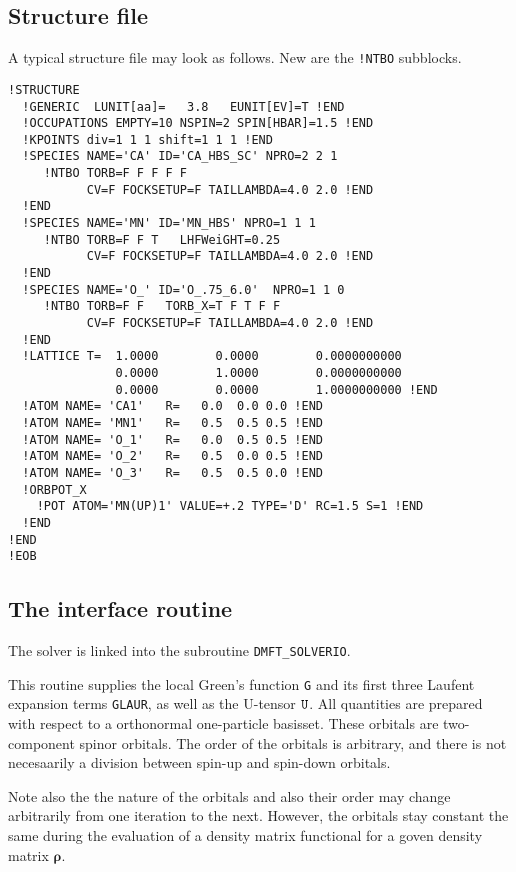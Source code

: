 \documentclass[11pt,a4paper]{report}
\newcommand{\mat}[1]{\bm{#1}}  %
\begin{document}
\subsection{Structure file}
A typical structure file may look as follows. New are the \verb|!NTBO|
subblocks.
\begin{verbatim}
!STRUCTURE 
  !GENERIC  LUNIT[aa]=   3.8   EUNIT[EV]=T !END
  !OCCUPATIONS EMPTY=10 NSPIN=2 SPIN[HBAR]=1.5 !END
  !KPOINTS div=1 1 1 shift=1 1 1 !END
  !SPECIES NAME='CA' ID='CA_HBS_SC' NPRO=2 2 1 
     !NTBO TORB=F F F F F  
           CV=F FOCKSETUP=F TAILLAMBDA=4.0 2.0 !END 
  !END
  !SPECIES NAME='MN' ID='MN_HBS' NPRO=1 1 1 
     !NTBO TORB=F F T   LHFWeiGHT=0.25
           CV=F FOCKSETUP=F TAILLAMBDA=4.0 2.0 !END 
  !END
  !SPECIES NAME='O_' ID='O_.75_6.0'  NPRO=1 1 0
     !NTBO TORB=F F   TORB_X=T F T F F   
           CV=F FOCKSETUP=F TAILLAMBDA=4.0 2.0 !END 
  !END
  !LATTICE T=  1.0000        0.0000        0.0000000000
               0.0000        1.0000        0.0000000000
               0.0000        0.0000        1.0000000000 !END
  !ATOM NAME= 'CA1'   R=   0.0  0.0 0.0 !END
  !ATOM NAME= 'MN1'   R=   0.5  0.5 0.5 !END
  !ATOM NAME= 'O_1'   R=   0.0  0.5 0.5 !END
  !ATOM NAME= 'O_2'   R=   0.5  0.0 0.5 !END
  !ATOM NAME= 'O_3'   R=   0.5  0.5 0.0 !END
  !ORBPOT_X
    !POT ATOM='MN(UP)1' VALUE=+.2 TYPE='D' RC=1.5 S=1 !END
  !END
!END 
!EOB
\end{verbatim}

\subsection{The interface routine}
The solver is linked into the subroutine \verb|DMFT_SOLVERIO|.

This routine supplies the local Green's function \verb|G| and its
first three Laufent expansion terms \verb|GLAUR|, as well as the
U-tensor $\verb|U|$. All quantities are prepared with respect to a
orthonormal one-particle basisset. These orbitals are two-component
spinor orbitals. The order of the orbitals is arbitrary, and there is
not necesaarily a division between spin-up and spin-down orbitals.

Note also the the nature of the orbitals and also their order may
change arbitrarily from one iteration to the next. However, the
orbitals stay constant the same during the evaluation of a density
matrix functional for a goven density matrix $\mat{\rho}$.
\end{document}
